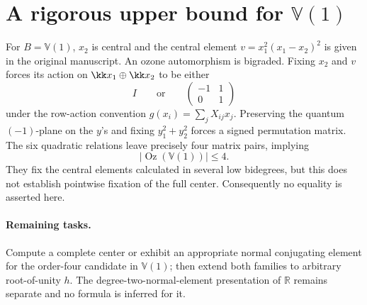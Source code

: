 \section{A rigorous upper bound for $\mathbb V(1)$}
For $B=\mathbb V(1)$, $x_2$ is central and the central element
$v=x_1^2(x_1-x_2)^2$ is given in the original manuscript. An ozone
automorphism is bigraded. Fixing $x_2$ and $v$ forces its action on
$\kk x_1\oplus\kk x_2$ to be either
\[
 I\qquad\text{or}\qquad
 \begin{pmatrix}-1&1\\0&1\end{pmatrix}
\]
under the row-action convention $g(x_i)=\sum_j X_{ij}x_j$.
Preserving the quantum $(-1)$-plane on the $y$'s and fixing
$y_1^2+y_2^2$ forces a signed permutation matrix. The six quadratic
relations leave precisely four matrix pairs, implying
\[
 |\operatorname{Oz}(\mathbb V(1))|\le 4.
\]
They fix the central elements calculated in several low bidegrees, but
this does not establish pointwise fixation of the full center.
Consequently no equality is asserted here.

\paragraph{Remaining tasks.} Compute a complete center or exhibit an
appropriate normal conjugating element for the order-four candidate
in $\mathbb V(1)$; then extend both families to arbitrary root-of-unity
$h$. The degree-two-normal-element presentation of $\mathbb R$
remains separate and no formula is inferred for it.
